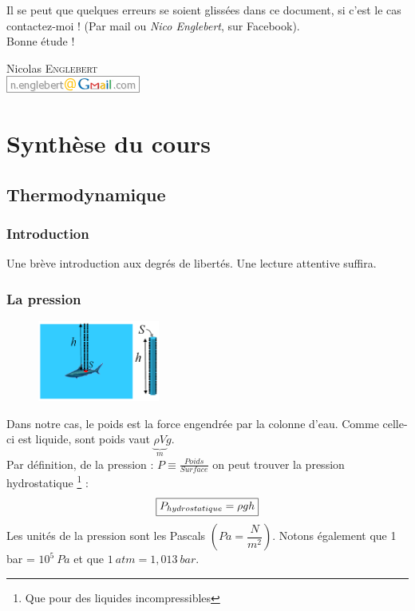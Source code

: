 \documentclass	[11pt, a4paper, openany]{book}
\begin{document}
Il se peut que quelques erreurs se soient glissées dans ce document, si c'est le cas contactez-moi ! (Par mail ou \textit{Nico Englebert}, sur Facebook).\\

Bonne étude ! 
\begin{flushright}
Nicolas \textsc{Englebert}\\
\includegraphics[scale=0.8]{gmail.png}
\end{flushright}

\mainmatter
\part{Synthèse du cours}
\chapter{Thermodynamique}
\section{Introduction}
Une brève introduction aux degrés de libertés. Une lecture attentive suffira.

\section{La pression}

\begin{figure}
\includegraphics[width=4cm]{th/image1.png}
\end{figure}

Dans notre cas, le poids est la force engendrée par la colonne d'eau. Comme celle-ci est liquide, sont poids vaut $\underbrace{\rho V}_m  g$.\\
Par définition, de la pression : $P \equiv \frac{Poids}{Surface}$ on peut trouver la pression hydrostatique \footnote{Que pour des liquides incompressibles} :
\begin{equation}
\fbox{$P_{hydrostatique} = \rho g h $}
\end{equation}
Les unités de la pression sont les Pascals $\left(Pa = \dfrac{N}{m^2}\right)$. Notons également que 1 bar = $10^5\ Pa$ et que $1\ atm = 1,013\ bar$.
\end{document}
